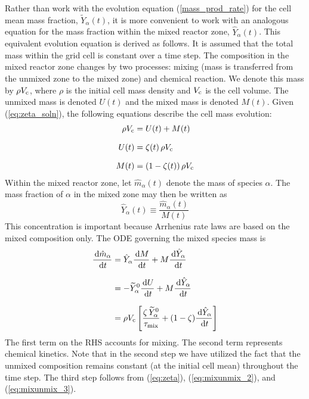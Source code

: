 Rather than work with the evolution equation (\ref{mass_prod_rate}) for the cell mean mass fraction, $\widetilde{Y}_\alpha(t)$, it is more convenient to work with an analogous equation for the mass fraction within the mixed reactor zone, $\hat{Y}_\alpha(t)$. This equivalent evolution equation is derived as follows. It is assumed that the total mass within the grid cell is constant over a time step. The composition in the mixed reactor zone changes by two processes: mixing (mass is transferred from the unmixed zone to the mixed zone) and chemical reaction. We denote this mass by $\rho V_{\rm c}$, where $\rho$ is the initial cell mass density and $V_{\rm c}$ is the cell volume.  The unmixed mass is denoted $U(t)$ and the mixed mass is denoted $M(t)$.  Given (\ref{eq:zeta_soln}), the following equations describe the cell mass evolution:
\begin{align}
\label{eq:mixunmix_1} \rho V_{\rm c} &= U(t) + M(t) \\[0.1in]
\label{eq:mixunmix_2} U(t) &= \zeta(t)\,\rho V_{\rm c} \\[0.1in]
\label{eq:mixunmix_3} M(t) &= (1-\zeta(t))\,\rho V_{\rm c}
\end{align}
Within the mixed reactor zone, let $\hat{m}_\alpha(t)$ denote the mass of species $\alpha$.  The mass fraction of $\alpha$ in the mixed zone may then be written as
\begin{equation}
\label{eq:mass_fraction_mixed}
\hat{Y}_{\alpha}(t)\equiv\frac{\hat{m}_{\alpha}(t)}{M(t)}
\end{equation}
This concentration is important because Arrhenius rate laws are based on the mixed composition only. The ODE governing the mixed species mass is
\begin{align}
\label{eq:mixmass}
\frac{\,\mathrm{d} \hat{m}_{\alpha}}{\,\mathrm{d} t} &= \hat{Y}_\alpha \frac{\,\mathrm{d} M}{\,\mathrm{d} t} + M \frac{\,\mathrm{d} \hat{Y}_\alpha}{\,\mathrm{d} t} \notag\\[0.1in]
&= - \widetilde{Y}_{\alpha}^0 \frac{\,\mathrm{d} U}{\,\mathrm{d} t} + M \frac{\,\mathrm{d} \hat{Y}_\alpha}{\,\mathrm{d} t} \notag\\[0.1in]
&= \rho V_{\rm c} \left[ \frac{\zeta \, \widetilde{Y}_{\alpha}^0 }{\tau_{\rm mix}} + (1-\zeta) \frac{\,\mathrm{d} \hat{Y}_\alpha}{\,\mathrm{d} t} \right]
\end{align}
The first term  on the RHS accounts for mixing.  The second term represents chemical kinetics. Note that in the second step we have utilized the fact that the unmixed composition remains constant (at the initial cell mean) throughout the time step. The third step follows from (\ref{eq:zeta}), (\ref{eq:mixunmix_2}), and (\ref{eq:mixunmix_3}).

